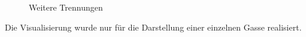\begin{figure}[h]
\hfill
{}
\caption{Weitere Trennungen}
\end{figure}
%
Die Visualisierung wurde nur für die Darstellung einer einzelnen Gasse realisiert. 

